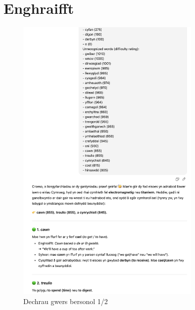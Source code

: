 \section{Enghraifft}
\begin{figure}[h]
    \centering
    \includegraphics[width=0.8\textwidth]{figures/lesson-1.png}
    \caption{Dechrau gwers bersonol 1/2}
    \label{fig:lesson1}
\end{figure}
